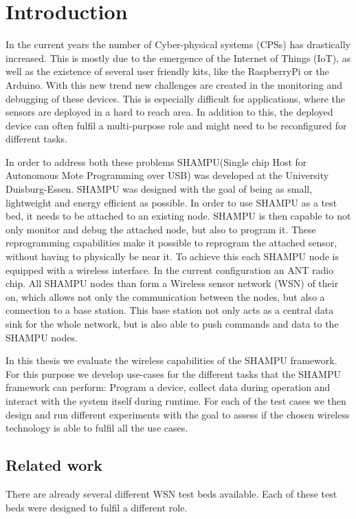 \chapter{Introduction}
\label{sec:intro}
In the current years the number of Cyber-physical systems (CPSs) has drastically increased. This is mostly due to the emergence of the Internet of Things (IoT), as well as the existence of several user friendly kits, like the RaspberryPi or the Arduino. With this new trend new challenges are created in the monitoring and debugging of these devices. This is especially difficult for applications, where the sensors are deployed in a hard to reach area. In addition to this, the deployed device can often fulfil a multi-purpose role and might need to be reconfigured for different tasks.

In order to address both these problems SHAMPU(Single chip Host for Autonomous Mote Programming over USB)\cite{Smeets:2014:DAL:2602339.2602401} was developed at the University Duisburg-Essen. SHAMPU was designed with the goal of being as small, lightweight and energy efficient as possible. In order to use SHAMPU as a test bed, it needs to be attached to an existing node. SHAMPU is then capable to not only monitor and debug the attached node, but also to program it. These reprogramming capabilities make it possible to reprogram the attached sensor, without having to physically be near it. To achieve this each SHAMPU node is equipped with a wireless interface. In the current configuration an ANT\cite{DynastreamInnovationsInc.2013} radio chip. All SHAMPU nodes than form a Wireless sensor network (WSN) of their on, which allows not only the communication between the nodes, but also a connection to a base station. This base station not only acts as a central data sink for the whole network, but is also able to push commands and data to the SHAMPU nodes.

In this thesis we evaluate the wireless capabilities of the SHAMPU framework. For this purpose we develop use-cases for the different tasks that the SHAMPU framework can perform: Program a device, collect data during operation and interact with the system itself during runtime. For each of the test cases we then design and run different experiments with the goal to assess if the chosen wireless technology is able to fulfil all the use cases.

\section{Related work}
\label{sec:related_work}
There are already several different WSN test beds available. Each of these test beds were designed to fulfil a different role. 

